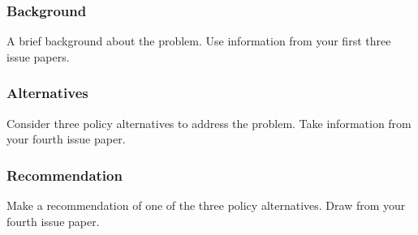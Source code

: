 \hypertarget{background}{%
\subsubsection{Background}\label{background}}

A brief background about the problem. Use information from your first three issue papers. 

\hypertarget{alternatives}{%
\subsubsection{Alternatives}\label{alternatives}}

Consider three policy alternatives to address the problem. Take
information from your fourth issue paper.

\hypertarget{recommendation}{%
\subsubsection{Recommendation}\label{recommendation}}

Make a recommendation of one of the three policy alternatives. Draw from your fourth issue paper. 
